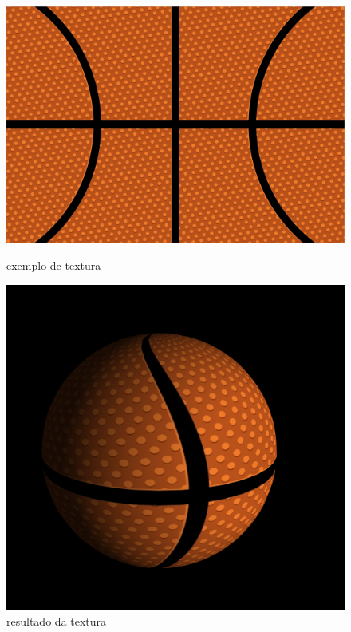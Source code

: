 \documentclass[a4paper]{report}
\begin{document}
\begin{figure}[H]
    \centering
    \begin{minipage}{0.50\textwidth}
        \centering
        \includegraphics[width=\textwidth]{images/basketball.png}
        \caption{exemplo de textura}
    \end{minipage}\hfill
    \begin{minipage}{0.49\textwidth}
        \centering
        \includegraphics[width=\textwidth]{images/basket_rendered.png}
        \caption{resultado da textura}
    \end{minipage}\hfill
\end{figure}
\end{document}
